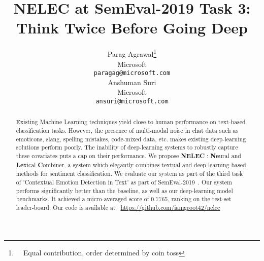 \documentclass[11pt,a4paper]{article}
\title{NELEC at SemEval-2019 Task 3: Think Twice Before Going Deep}
\author{Parag Agrawal\thanks{\ \ Equal contribution, order determined by coin toss} \\
  Microsoft \\
  {\tt paragag@microsoft.com} \\\And
  Anshuman Suri\footnotemark[1]  \\
  Microsoft \\
  {\tt ansuri@microsoft.com} \\}
\date{}
\begin{document}
\maketitle
\begin{abstract}
  Existing Machine Learning techniques yield close to human performance on text-based classification tasks. However, the presence of multi-modal noise in chat data such as emoticons, slang, spelling mistakes, code-mixed data, etc. makes existing deep-learning solutions perform poorly. The inability of deep-learning systems to robustly capture these covariates puts a cap on their performance. We propose \textbf{NELEC} : \textbf{Ne}ural and \textbf{Le}xical \textbf{C}ombiner, a system which elegantly combines textual and deep-learning based methods for sentiment classification. We evaluate our system as part of the third task of 'Contextual Emotion Detection in Text' as part of SemEval-2019~\cite{SemEval2019Task3}. Our system performs significantly better than the baseline, as well as our deep-learning model benchmarks. It achieved a micro-averaged  score of 0.7765, ranking  on the test-set leader-board. Our code is available at ~\url{https://github.com/iamgroot42/nelec}
\end{abstract}
\end{document}
